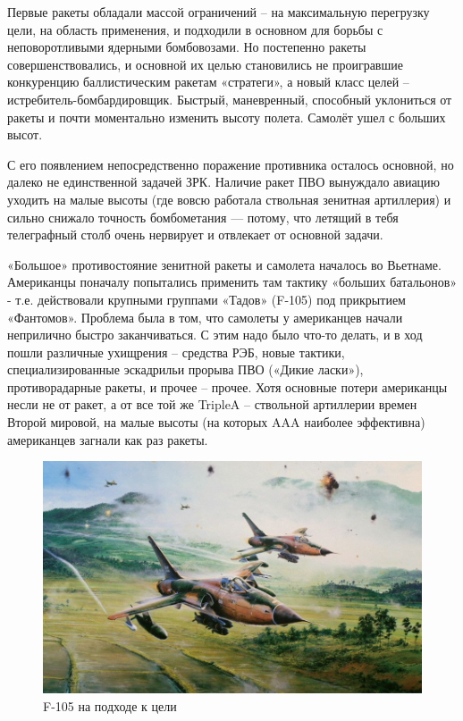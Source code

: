 Первые ракеты обладали массой ограничений – на максимальную перегрузку цели, на область применения, и подходили в основном для борьбы с неповоротливыми ядерными бомбовозами. Но постепенно ракеты совершенствовались, и основной их целью становились не проигравшие конкуренцию баллистическим ракетам «стратеги», а новый класс целей – истребитель-бомбардировщик. Быстрый, маневренный, способный уклониться от ракеты и почти моментально изменить высоту полета. Самолёт ушел с больших высот.

С его появлением непосредственно поражение противника осталось основной, но далеко не единственной задачей ЗРК. Наличие ракет ПВО вынуждало авиацию уходить на малые высоты (где вовсю работала ствольная зенитная артиллерия) и сильно снижало точность бомбометания — потому, что летящий в тебя телеграфный столб очень нервирует и отвлекает от основной задачи.

«Большое» противостояние зенитной ракеты и самолета началось во Вьетнаме. Американцы поначалу попытались применить там тактику «больших батальонов» - т.е. действовали крупными группами «Тадов» (F-105) под прикрытием «Фантомов». Проблема была в том, что самолеты у американцев начали неприлично быстро заканчиваться. С этим надо было что-то делать, и в ход пошли различные ухищрения – средства РЭБ, новые тактики, специализированные эскадрильи прорыва ПВО («Дикие ласки»), противорадарные ракеты, и прочее – прочее. Хотя основные потери американцы несли не от ракет, а от все той же TripleA – ствольной артиллерии времен Второй мировой, на малые высоты (на которых AAA наиболее эффективна) американцев загнали как раз ракеты.

\begin{figure}[h!tb] 
	\centering\includegraphics[scale=0.4]{Bekaa_1/nUxQ0UTz6pQ.jpg}
	\caption{F-105 на подходе к цели}%
\end{figure}


